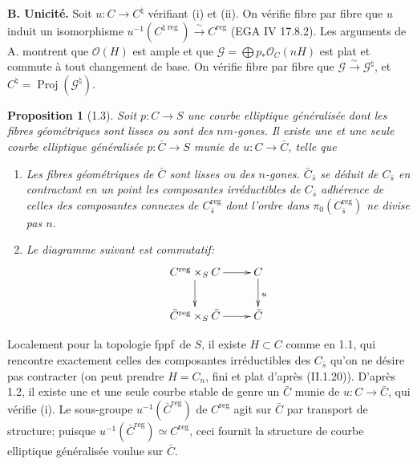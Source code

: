 \documentclass[11pt,a4paper]{amsart}
\theoremstyle{plain}
\newtheorem{proposition}[theorem]{Proposition}
\theoremstyle{definition}
\DeclareMathOperator{\Proj}{Proj}
\DeclareMathOperator{\reg}{reg}
\newcommand{\CO}{\mathcal{O}}
\newcommand{\CG}{\mathcal{G}}
\newcommand{\fppf}{\textup{fppf}}
\begin{document}
\medskip

\noindent\textbf{B. Unicit\'e.} Soit $u \colon C \to C^{\natural}$ v\'erifiant (i) et (ii). On v\'erifie fibre par fibre que $u$ induit un isomorphisme $u^{-1}(C^{\natural \reg}) \xrightarrow{\sim} C^{\reg}$ (EGA IV 17.8.2). Les arguments de A. montrent que $\CO(H)$ est ample et que $\CG = \bigoplus p_* \CO_{C}(nH)$ est plat et commute \`a tout changement de base. On v\'erifie fibre par fibre que $\CG \xrightarrow{\sim} \CG^{\natural}$, et $C^{\natural} = \Proj(\CG^{\natural})$.

\begin{proposition}[1.3]
Soit $p \colon C \to S$ une courbe elliptique g\'en\'eralis\'ee dont les fibres g\'eom\'etriques sont lisses ou sont des $nm$-gones. Il existe une et une seule courbe elliptique g\'en\'eralis\'ee $p \colon \bar{C} \to S$ munie de $u \colon C \to \bar{C}$, telle que
\begin{enumerate}[label=(\roman*)]
\item Les fibres g\'eom\'etriques de $\bar{C}$ sont lisses ou des $n$-gones. $\bar{C}_{\bar{s}}$ se d\'eduit de $C_{\bar{s}}$ en contractant en un point les composantes irr\'eductibles de $C_{\bar{s}}$ adh\'erence de celles des composantes connexes de $C^{\reg}_{\bar{s}}$ dont l'ordre dans $\pi_0(C^{\reg}_{\bar{s}})$ ne divise pas $n$.
\item Le diagramme suivant est commutatif:
\[
\xymatrix{
C^{\reg} \times_S C \ar[r] \ar[d] & C \ar[d]^{u} \\
\bar{C}^{\reg} \times_S \bar{C} \ar[r] & \bar{C}
}
\]
\end{enumerate}
\end{proposition}

Localement pour la topologie \fppf\ de $S$, il existe $H \subset C$ comme en 1.1, qui rencontre exactement celles des composantes irr\'eductibles des $C_{\bar{s}}$ qu'on ne d\'esire pas contracter (on peut prendre $H = C_n$, fini et plat d'apr\`es (II.1.20)). D'apr\`es 1.2, il existe une et une seule courbe stable de genre un $\bar{C}$ munie de $u \colon C \to \bar{C}$, qui v\'erifie (i). Le sous-groupe $u^{-1}(\bar{C}^{\reg})$ de $C^{\reg}$ agit sur $\bar{C}$ par transport de structure; puisque $u^{-1}(\bar{C}^{\reg}) \simeq C^{\reg}$, ceci fournit la structure de courbe elliptique g\'en\'eralis\'ee voulue sur $\bar{C}$.
\end{document}
